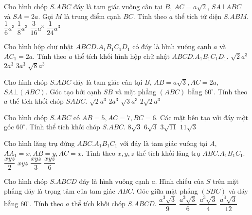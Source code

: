 \begin{ex}%
Cho hình chóp  $S.ABC$  đáy là tam giác vuông cân tại 
$B$, $AC = a\sqrt{2}$,   $SA  \bot ABC$ và $SA = 2a$. Gọi $M$ là trung điểm cạnh $BC$. Tính theo $a$ thể tích tứ diện $S.ABM$.
\choice
{\True $\dfrac{1}{6}a^3$}
{$\dfrac{1}{8}a^3$}
{$\dfrac{3}{16}a^3$}
{$\dfrac{1}{24}a^3$}
\end{ex}



\begin{ex}%
 Cho hình hộp chữ nhật $ABCD.A_1 B_1 C_1 D_1$
 có  đáy là hình vuông cạnh $a$  và  $AC_1 = 2a$. Tính theo 
$a$ thể tích khối hình hộp chữ nhật 
$ABCD.A_1 B_1 C_1 D_1$.
\choice
{\True $\sqrt{2}a^3$}
{$2a^3$}
{$3a^3$}
{$\sqrt{8}a^3$}
\end{ex}

\begin{ex}%
 Cho hình chóp $S.ABC$  đáy là tam giác cân tại  $B$, $AB = a\sqrt{3},AC = 2a$, $SA\bot (ABC)$. Góc tạo bởi cạnh $SB$ và mặt phẳng $(ABC)$ bằng $60^\circ$. Tính theo $a$ thể tích khối chóp $SABC.$
\choice
{\True $\sqrt{2}a^3$}
{$2a^3$}
{$\sqrt{3}a^3$}
{$2\sqrt{2}a^3$}
\end{ex}


\begin{ex}%
Cho hình chóp  $S.ABC$  có $AB = 5, AC = 7, BC = 6$. Các mặt bên tạo với đáy một góc $60^\circ$. Tính thể tích khối chóp $S.ABC$.
\choice
{\True $8\sqrt{3}$}
{$6\sqrt{3}$}
{$3\sqrt{11}$}
{$11\sqrt{3}$}
\end{ex}



\begin{ex}%
Cho hình lăng trụ đứng $ABC.A_1B_1C_1$ với đáy là tam giác vuông tại $A$, $AA_1=x,AB=y,AC=x$. Tính theo $x,y,z$ thể tích khối lăng trụ $ABC.A_1B_1C_1$.
\choice
{\True $\dfrac{xyz}{2}$}
{$xyz$}
{$\dfrac{xyz}{3}$}
{$\dfrac{xyz}{6}$}
\end{ex}

\begin{ex}%
Cho hình chóp $S.ABCD$  đáy là hình vuông cạnh  $a$. Hình chiếu của  $S$  trên mặt phẳng đáy là trọng tâm của tam giác $ABC$. Góc giữa mặt phẳng $(SBC)$ và đáy bằng $60^\circ$. Tính theo $a$ thể tích khối chóp $S.ABCD$.
\choice
{\True $\dfrac{a^3\sqrt{3}}{9}$}
{$\dfrac{a^3\sqrt{3}}{6}$}
{$\dfrac{a^3\sqrt{3}}{4}$}
{$\dfrac{a^3\sqrt{3}}{12}$}
\end{ex}


